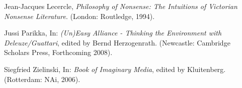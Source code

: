 {Jean{}-Jacques Lecercle, {\em Philosophy of Nonsense: The Intuitions
of Victorian Nonsense Literature}. (London: Routledge, 1994).

Jussi Parikka,  In: {\em (Un)Easy Alliance {}- Thinking the
Environment with Deleuze/Guattari}, edited by Bernd
Herzogenrath. (Newcastle: Cambridge Scholars Press, Forthcoming
2008).

Siegfried Zielinski,  In: {\em Book of Imaginary Media}, edited by Kluitenberg.
(Rotterdam: NAi, 2006).}
